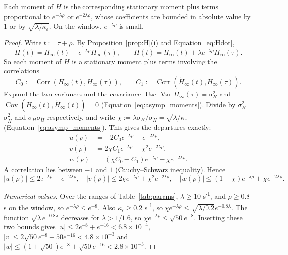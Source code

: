\documentclass[a4paper,11pt]{article}
\theoremstyle{definition}
\newcommand{\Var}{\operatorname{Var}}
\newcommand{\Cov}{\operatorname{Cov}}
\newcommand{\1}{\mathbbm{1}}
\begin{document}
Each moment of $H$ is the corresponding stationary moment plus terms proportional to $e^{-\lambda\rho}$ or $e^{-2\lambda\rho}$, whose coefficients are bounded in absolute value by 1 or by $\sqrt{\lambda/\kappa_{\varepsilon}}$. On the window, $e^{-\lambda\rho}$ is small.

\begin{proof}
Write $t:=\tau+\rho$. By Proposition~\ref{prop:H}(i) and Equation~\eqref{eq:Hdot},
\begin{equation*}
H(t)=H_{\infty}(t)-e^{-\lambda\rho}H_{\infty}(\tau), \qquad \dot{H}(t)=\dot{H}_{\infty}(t)+\lambda e^{-\lambda\rho}H_{\infty}(\tau).
\end{equation*}
So each moment of $H$ is a stationary moment plus terms involving the correlations
\begin{equation*}
C_{0}:=\operatorname{Corr}\left(H_{\infty}(t),H_{\infty}(\tau)\right), \qquad C_{1}:=\operatorname{Corr}\left(\dot{H}_{\infty}(t),H_{\infty}(\tau)\right).
\end{equation*}
Expand the two variances and the covariance. Use $\Var H_{\infty}(\tau)=\sigma_{H}^{2}$ and $\Cov(H_{\infty}(t),\dot{H}_{\infty}(t))=0$ (Equation~\eqref{eq:asymp_moments}). Divide by $\sigma_{H}^{2}$, $\sigma_{\dot{H}}^{2}$ and $\sigma_{H}\sigma_{\dot{H}}$ respectively, and write $\chi:=\lambda\sigma_{H}/\sigma_{\dot{H}}=\sqrt{\lambda/\kappa_{\varepsilon}}$ (Equation~\eqref{eq:asymp_moments}). This gives the departures exactly:
\begin{equation*}
\begin{aligned}
u(\rho)&=-2C_{0}e^{-\lambda\rho}+e^{-2\lambda\rho},\\
v(\rho)&=2\chi C_{1}e^{-\lambda\rho}+\chi^{2}e^{-2\lambda\rho},\\
w(\rho)&=\left(\chi C_{0}-C_{1}\right)e^{-\lambda\rho}-\chi e^{-2\lambda\rho}.
\end{aligned}
\end{equation*}
A correlation lies between $-1$ and $1$ (Cauchy--Schwarz inequality). Hence
\begin{equation*}
|u(\rho)|\le 2e^{-\lambda\rho}+e^{-2\lambda\rho}, \quad |v(\rho)|\le 2\chi e^{-\lambda\rho}+\chi^{2}e^{-2\lambda\rho}, \quad |w(\rho)|\le(1+\chi)e^{-\lambda\rho}+\chi e^{-2\lambda\rho}.
\end{equation*}

\emph{Numerical values.} Over the ranges of Table~\ref{tab:params}, $\lambda\ge 10$ s\textsuperscript{-1}, and $\rho\ge 0.8$ s on the window, so $e^{-\lambda\rho}\le e^{-8}$. Also $\kappa_{\varepsilon}\ge 0.2$ s\textsuperscript{-1}, so $\chi e^{-\lambda\rho}\le\sqrt{\lambda/0.2}e^{-0.8\lambda}$. The function $\sqrt{\lambda}e^{-0.8\lambda}$ decreases for $\lambda>1/1.6$, so $\chi e^{-\lambda\rho}\le\sqrt{50}e^{-8}$. Inserting these two bounds gives $|u|\le 2e^{-8}+e^{-16}<6.8\times10^{-4}$, $|v|\le 2\sqrt{50}e^{-8}+50e^{-16}<4.8\times10^{-3}$ and $|w|\le(1+\sqrt{50})e^{-8}+\sqrt{50}e^{-16}<2.8\times10^{-3}$.
\end{proof}
\end{document}
